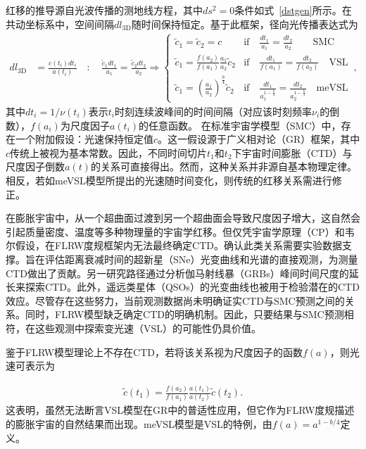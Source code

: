 \documentclass[jkps,preprint,fleqn]{revtex4}
\newcommand{\tc}{\tilde{c}}
\begin{document}
红移的推导源自光波传播的测地线方程，其中$ds^2 = 0$条件如式~\eqref{dstgen}所示。在共动坐标系中，空间间隔$dl_{3\textrm{D}}$随时间保持恒定\cite{Lee:2024mal,Lee:2024zcu}。基于此框架，径向光传播表达式为
\begin{align}
d l_{3\textrm{D}} &= \frac{c(t_i) dt_i}{a(t_i)} \quad : \quad \frac{\tc_1 dt_1}{a_1} = \frac{\tc_2 dt_2}{a_2} \Rightarrow \begin{cases} \tc_1 = \tc_2 = c & \textrm{if} \quad \frac{dt_1}{a_1} = \frac{dt_2}{a_2} \qquad \textrm{SMC} \\
\tc_1 = \frac{f(a_2)}{f(a_1)} \frac{a_1}{a_2} \tc_2 & \textrm{if} \quad \frac{dt_1}{f(a_1)} = \frac{dt_2}{f(a_2)} \quad \textrm{VSL} \\ \tc_1 = \left( \frac{a_1}{a_2}\right)^{\frac{b}{4}} \tc_2 & \textrm{if} \quad \frac{dt_1}{a_1^{1-\frac{b}{4}}} = \frac{dt_2}{a_2^{1-\frac{b}{4}}} \quad \textrm{meVSL}  \end{cases} \,, \label{dl3D}
\end{align}
其中$dt_i = 1/\nu(t_i)$表示$t_i$时刻连续波峰间的时间间隔（对应该时刻频率$\nu_i$的倒数），$f(a_i)$为尺度因子$a(t_i)$的任意函数。
在标准宇宙学模型（SMC）中，存在一个附加假设：光速保持恒定值$c$。这一假设源于广义相对论（GR）框架，其中$c$传统上被视为基本常数。因此，不同时间切片$t_1$和$t_2$下宇宙时间膨胀（CTD）与尺度因子倒数$a(t)$的关系可直接得出。然而，这种关系并非源自基本物理定律。相反，若如meVSL模型所提出的光速随时间变化，则传统的红移关系需进行修正。

在膨胀宇宙中，从一个超曲面过渡到另一个超曲面会导致尺度因子增大，这自然会引起质量密度、温度等多种物理量的宇宙学红移。但仅凭宇宙学原理（CP）和韦尔假设，在FLRW度规框架内无法最终确定CTD。确认此类关系需要实验数据支撑。旨在评估距离衰减时间的超新星（SNe）光变曲线和光谱的直接观测，为测量CTD做出了贡献\cite{Leibundgut:1996qm,SupernovaSearchTeam:1997gem,Foley:2005qu,Blondin:2007ua,Blondin:2008mz,Lee:2023ucu,DES:2024vgg,Lee:2024kxa}。另一研究路径通过分析伽马射线暴（GRBs）峰间时间尺度的延长来探索CTD\cite{Norris:1993hda,Wijers:1994qf,Band:1994ee,Meszaros:1995gj,Lee:1996zu,Chang:2001fy,Crawford:2009be,Zhang:2013yna,Singh:2021jgr}。此外，遥远类星体（QSOs）的光变曲线也被用于检验潜在的CTD效应\cite{Hawkins:2001be,Dai:2012wp,Lewis:2023jab}。尽管存在这些努力，当前观测数据尚未明确证实CTD与SMC预测之间的关系。同时，FLRW模型缺乏确定CTD的明确机制。因此，只要结果与SMC预测相符，在这些观测中探索变光速（VSL）的可能性仍具价值。

鉴于FLRW模型理论上不存在CTD，若将该关系视为尺度因子的函数$f(a)$，则光速可表示为

\begin{align} \tc(t_1) = \frac{f(a_2)}{f(a_1)} \frac{a(t_1)}{a(t_2)} \tc(t_2) \label{cVSL}. \end{align}这表明，虽然无法断言VSL模型在GR中的普适性应用，但它作为FLRW度规描述的膨胀宇宙的自然结果而出现。meVSL模型是VSL的特例，由$f(a) = a^{1-b/4}$定义\cite{Lee:2020zts,Lee:2023bjz}。
\end{document}
